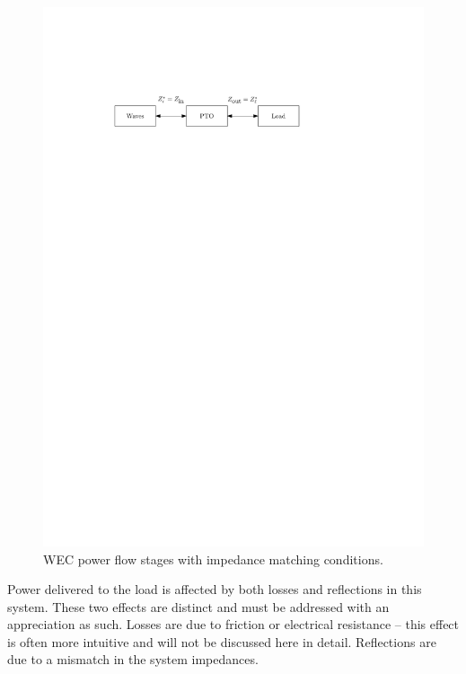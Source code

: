 \documentclass[lettersize,journal]{IEEEtran}
\begin{document}
\begin{figure}[tb]
        \centering
        \includegraphics[width=1\columnwidth]{wec_as_multiport_power_transfer_stages.pdf}
        \caption{WEC power flow stages with impedance matching conditions.}
        \label{fig:wec_as_multiport_power_transfer_stages}
\end{figure}

Power delivered to the load is affected by both losses and reflections in this system.
These two effects are distinct and must be addressed with an appreciation as such.
Losses are due to friction or electrical resistance -- this effect is often more intuitive and will not be discussed here in detail.
Reflections are due to a mismatch in the system impedances.
\end{document}
